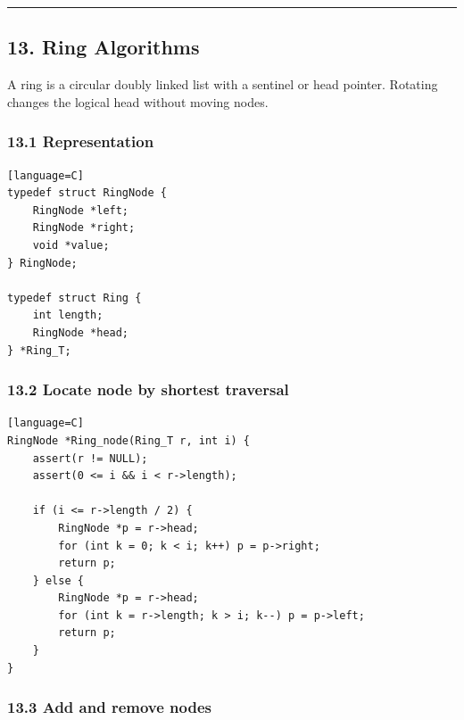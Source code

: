 \documentclass[11pt]{article}
\begin{document}
\begin{center}\rule{0.5\linewidth}{0.5pt}\end{center}

\subsection{13. Ring Algorithms}\label{ring-algorithms}

A ring is a circular doubly linked list with a sentinel or head pointer. Rotating changes the logical head without moving nodes.

\subsubsection{13.1 Representation}\label{representation-5}

\begin{verbatim}[language=C]
typedef struct RingNode {
    RingNode *left;
    RingNode *right;
    void *value;
} RingNode;

typedef struct Ring {
    int length;
    RingNode *head;
} *Ring_T;
\end{verbatim}

\subsubsection{13.2 Locate node by shortest traversal}\label{locate-node-by-shortest-traversal}

\begin{verbatim}[language=C]
RingNode *Ring_node(Ring_T r, int i) {
    assert(r != NULL);
    assert(0 <= i && i < r->length);

    if (i <= r->length / 2) {
        RingNode *p = r->head;
        for (int k = 0; k < i; k++) p = p->right;
        return p;
    } else {
        RingNode *p = r->head;
        for (int k = r->length; k > i; k--) p = p->left;
        return p;
    }
}
\end{verbatim}

\subsubsection{13.3 Add and remove nodes}\label{add-and-remove-nodes}
\end{document}
